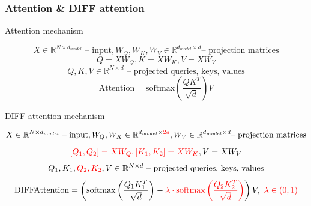 \documentclass[10pt]{beamer}
\begin{document}
\begin{frame}
    \frametitle{Attention \& DIFF attention}

    \begin{block}{Attention mechanism}
        \vspace{-0.5cm}

        $$X \in \mathbb{R}^{N \times d_{model}}\text{ -- input}, W_Q, W_K, W_V \in \mathbb{R}^{d_{model} \times d} \text{-- projection matrices}$$
        $$Q = X W_Q, K = X W_K, V = X W_V$$
        $$Q, K, V \in \mathbb{R}^{N \times d} \text{ -- projected queries, keys, values}$$
        $$\text{Attention} = \text{softmax}\left(\frac{Q K^T}{\sqrt{d}}\right) V$$

    \end{block}

    \begin{block}{DIFF attention mechanism}
        \vspace{-0.5cm}

        $$X \in \mathbb{R}^{N \times d_{model}}\text{ -- input}, W_Q, W_K \in \mathbb{R}^{d_{model} \times \textcolor{red}{2d}}, W_V \in \mathbb{R}^{d_{model} \times d}  \text{-- projection matrices}$$
        $$\textcolor{red}{[Q_1, Q_2] = X W_Q, [K_1, K_2] = X W_K}, V = X W_V$$
        $$Q_1, K_1, \textcolor{red}{Q_2, K_2}, V \in \mathbb{R}^{N \times d} \text{ -- projected queries, keys, values}$$
        $$\text{DIFFAttention} = \left(\text{softmax}\left(\frac{Q_1 K_1^T}{\sqrt{d}}\right) - \textcolor{red}{\lambda\cdot \text{softmax}\left(\frac{Q_2 K_2^T}{\sqrt{d}}\right)}\right)V, ~ \textcolor{red}{\lambda \in (0,1)}$$

    \end{block}

\end{frame}
\end{document}
